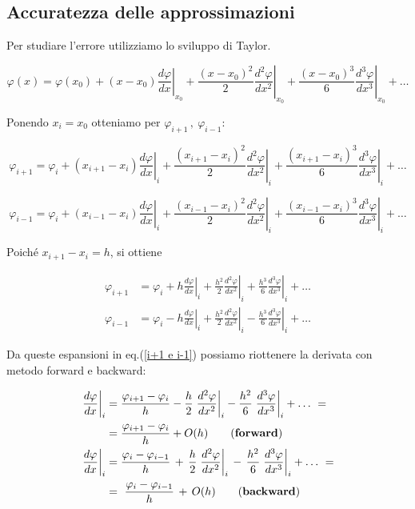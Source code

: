 \subsection*{Accuratezza delle approssimazioni}

Per studiare l'errore utilizziamo lo sviluppo di Taylor.

\[
\varphi(x) =
\varphi(x_0)
+
(x-x_0)\left.\frac{d\varphi}{dx}\right|_{x_0}
+
\frac{(x-x_0)^2}{2}
\left.\frac{d^2\varphi}{dx^2}\right|_{x_0}
+
\frac{(x-x_0)^3}{6}
\left.\frac{d^3\varphi}{dx^3}\right|_{x_0}
+ \dots
\]

Ponendo $x_i = x_0$ otteniamo per $\varphi_{i+1}\,,\ \varphi_{i-1}$:

\[
\varphi_{i+1} =
\varphi_i
+
(x_{i+1}-x_i)
\left.\frac{d\varphi}{dx}\right|_i
+
\frac{(x_{i+1}-x_i)^2}{2}
\left.\frac{d^2\varphi}{dx^2}\right|_i
+
\frac{(x_{i+1}-x_i)^3}{6}
\left.\frac{d^3\varphi}{dx^3}\right|_i
+ \dots
\]

\[
\varphi_{i-1} =
\varphi_i
+
(x_{i-1}-x_i)
\left.\frac{d\varphi}{dx}\right|_i
+
\frac{(x_{i-1}-x_i)^2}{2}
\left.\frac{d^2\varphi}{dx^2}\right|_i
+
\frac{(x_{i-1}-x_i)^3}{6}
\left.\frac{d^3\varphi}{dx^3}\right|_i
+ \dots
\]

Poiché $x_{i+1}-x_i = h$, si ottiene

\begin{equation}\label{i+1 e i-1}
	\begin{aligned}
	\varphi_{i+1} &=
	\varphi_i +
	h \left.\frac{d\varphi}{dx}\right|_i +
	\frac{h^2}{2}\left.\frac{d^2\varphi}{dx^2}\right|_i +
	\frac{h^3}{6}\left.\frac{d^3\varphi}{dx^3}\right|_i + \dots \\
	\varphi_{i-1} &=
	\varphi_i -
	h \left.\frac{d\varphi}{dx}\right|_i +
	\frac{h^2}{2}\left.\frac{d^2\varphi}{dx^2}\right|_i -
	\frac{h^3}{6}\left.\frac{d^3\varphi}{dx^3}\right|_i
	+ \dots
	\end{aligned}
\end{equation}

Da queste espansioni in eq.(\ref{i+1 e i-1}) possiamo riottenere la derivata con metodo forward e backward:

\begin{equation}\label{der}
	\begin{aligned}
	\left.\frac{d\varphi}{dx}\right|_i &=
	\frac{\varphi_{i+1}-\varphi_i}{h} -
	\frac{h}{2}\left.\frac{d^2\varphi}{dx^2}\right|_i -
	\frac{h^2}{6}\left.\frac{d^3\varphi}{dx^3}\right|_i
	+ \dots\ =\\
	& =
	\frac{\varphi_{i+1}-\varphi_i}{h}
	+ O(h)\qquad \text{(\textbf{forward})}\\
	\left.\frac{d\varphi}{dx}\right|_i &=
	\frac{\varphi_i-\varphi_{i-1}}{h}
	\, +\,
	\frac{h}{2}\left.\frac{d^2\varphi}{dx^2}\right|_i
	\, -\,
	\frac{h^2}{6}\left.\frac{d^3\varphi}{dx^3}\right|_i
	+ \dots\ =\\
	& =\ \frac{\varphi_i-\varphi_{i-1}}{h}\, +\, O(h)
	\qquad \text{(\textbf{backward})}
	\end{aligned}	
\end{equation}

